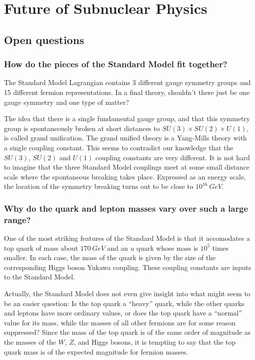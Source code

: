 \documentclass[../../main/main.tex]{subfiles}
\begin{document}

\section{Future of Subnuclear Physics}

\subsection{Open questions}

\subsubsection{How do the pieces of the Standard Model fit together?}
The Standard Model Lagrangian contains 3 different gauge symmetry groups and 15 different fermion representations. In a final theory, shouldn’t there just be one gauge symmetry and one type of matter?

The idea that there is a single fundamental gauge group, and that this symmetry group is spontaneously broken at short distances to \( SU(3) \times SU(2) \times U(1) \), is called grand unification. The grand unified theory is a Yang-Mills theory with a single coupling constant. This seems to contradict our knowledge that the \( SU(3) \), \( SU(2) \) and \( U(1) \) coupling constants are very different. It is not hard to imagine that the three Standard Model couplings meet at some small distance scale where the spontaneous breaking takes place. Expressed as an energy scale, the location of the symmetry breaking turns out to be close to \( 10^{16} \ \si{GeV} \).


\subsubsection{Why do the quark and lepton masses vary over such a large range?}
One of the most striking features of the Standard Model is that it accomodates a top quark of mass about \( 170 \ \si{GeV} \) and an \( u \) quark whose mass is \( 10^5 \) times smaller. In each case, the mass of the quark is given by the size of the corresponding Higgs boson Yukawa coupling. These coupling constants are inputs to the Standard Model.

Actually, the Standard Model does not even give insight into what might seem to be an easier question: Is the top quark a ``heavy'' quark, while the other quarks and leptons have more ordinary values, or does the top quark have a ``normal'' value for its mass, while the masses of all other fermions are for some reason suppressed? Since the mass of the top quark is of the same order of magnitude as the masses of the \( W \), \( Z \), and Higgs bosons, it is tempting to say that the top quark mass is of the expected magnitude for fermion masses.
\end{document}
